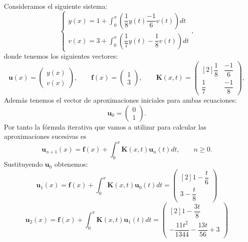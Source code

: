 \begin{ejemplo}
	Consideramos el siguiente sistema:
	\begin{equation}
		\left\lbrace\begin{array}{c}y(x) = 1 + \displaystyle \int_0^x (\dfrac{1}{8}y(t)\dfrac{-1}{6}v(t))dt \\ v(x) = 3+ \displaystyle \int_0^x (\dfrac{1}{7}y(t)-\dfrac{1}{8}v(t))dt \end{array}\right.,
	\end{equation}
	donde tenemos los siguientes vectores:
	\begin{equation}
		\textbf{u}(x) = \begin{pmatrix}	y(x) \\ v(x)	\end{pmatrix}, \qquad \textbf{f}(x) = \begin{pmatrix}	1 \\ 3	\end{pmatrix}, \qquad \textbf{K}(x,t) = \begin{pmatrix}[2]	\dfrac{1}{8} & \dfrac{-1}{6} \\ \dfrac{ 1}{7} & \dfrac{-1}{8}	\end{pmatrix},
	\end{equation}
	Además tenemos el vector de aproximaciones iniciales para ambas ecuaciones:
	\begin{equation}
		\textbf{u}_0 = \begin{pmatrix}	0 \\ 1	\end{pmatrix}.
	\end{equation}
	Por tanto la fórmula iterativa que vamos a utilizar para calcular las aproximaciones sucesivas es
	\begin{equation}
		\textbf{u}_{n+1}(x) = \textbf{f}(x) + \int_0^x \textbf{K}(x,t)\textbf{u}_n(t)dt, \qquad n \geqslant 0.
	\end{equation}
	Sustituyendo $\textbf{u}_0$ obtenemos:
	\begin{equation}
		\textbf{u}_{1}(x) = \textbf{f}(x) + \int_0^x \textbf{K}(x,t)\textbf{u}_0(t)dt = \begin{pmatrix}[2]	1-\dfrac{t}{6} \\ 3-\dfrac{t}{8}	\end{pmatrix}
	\end{equation}
	\begin{equation}
		\textbf{u}_{2}(x) = \textbf{f}(x) + \int_0^x \textbf{K}(x,t)\textbf{u}_1(t)dt = \begin{pmatrix}[2]	1-\dfrac{3t}{8} \\ -\dfrac{11t^2}{1344}-\dfrac{13t}{56}+3	\end{pmatrix}

\end{equation}
\end{ejemplo}
